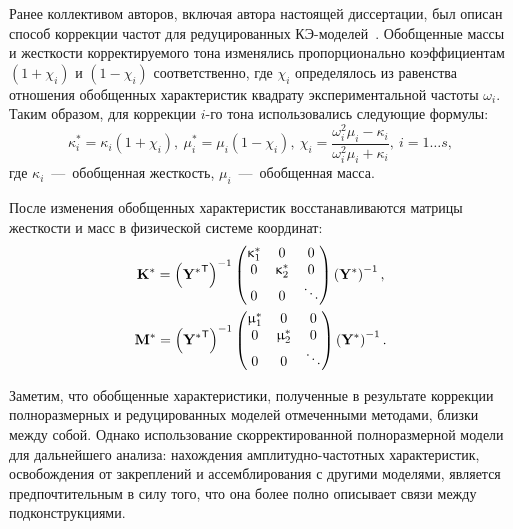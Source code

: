 Ранее коллективом авторов, включая автора настоящей диссертации, был описан способ коррекции частот для редуцированных КЭ-моделей~\cite{lib:author:spacecraft:cms}. Обобщенные массы и жесткости корректируемого тона изменялись пропорционально коэффициентам $ (1 + \chi_i) $ и $ (1 - \chi_i) $ соответственно, где $ \chi_i $ определялось из равенства отношения обобщенных характеристик квадрату экспериментальной частоты $ \omega_i $. Таким образом, для коррекции $ i $-го тона использовались следующие формулы:
\begin{equation}
	\kappa_i ^ * = \kappa_i (1 + \chi_i), \ \mu_i ^ * = \mu_i (1 - \chi_i), \ \chi_i = \frac{\omega_i ^ 2 \mu_i - \kappa_i}{\omega_i ^ 2 \mu_i + \kappa_i}, \ i = 1 \hdots s, \label{eq:reducedGenParametersUpdating}
\end{equation}
где $ \kappa_i $~---~обобщенная жесткость, $ \mu_i $~---~обобщенная масса.

После изменения обобщенных характеристик восстанавливаются матрицы жесткости и масс в физической системе координат:
\begin{equation}
	\begin{gathered}
		\mathbf{K} ^ \ast = 
		\left( \mathbf{Y ^ \ast} ^ \mathsf{T} \right) ^ {-1} 
		\begin{pmatrix}
			\upkappa_1 ^ \ast & 0 & 0 \\
			0 & \upkappa_2 ^ \ast & 0 \\
			0 & 0 & \ddots
		\end{pmatrix} 
		\left( \mathbf{Y} ^ \ast \right) ^ {-1}, \\
		\mathbf{M} ^ \ast = 
		\left( \mathbf{Y ^ \ast} ^ \mathsf{T} \right) ^ {-1} 
		\begin{pmatrix}
			\upmu_1 ^ \ast & 0 & 0 \\
			0 & \upmu_2 ^ \ast & 0 \\
			0 & 0 & \ddots
		\end{pmatrix}
		\left( \mathbf{Y} ^ \ast \right) ^ {-1}.
	\end{gathered}
	\label{eq:reducedStructuralMatrices}
\end{equation}

Заметим, что обобщенные характеристики, полученные в результате коррекции полноразмерных и редуцированных моделей отмеченными методами, близки между собой. Однако использование скорректированной полноразмерной модели для дальнейшего анализа: нахождения амплитудно-частотных характеристик, освобождения от закреплений и ассемблирования с другими моделями, является предпочтительным в силу того, что она более полно описывает связи между подконструкциями.

